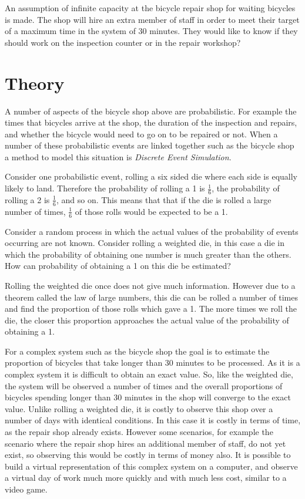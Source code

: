 An assumption of infinite capacity at the bicycle repair shop
for waiting bicycles is made.
The shop will hire an extra member of staff in order to meet their target of a
maximum time in the system of 30 minutes. They would like to know if they
should work on the inspection counter or in the repair workshop?

\section{Theory}\label{sec:theory}

A number of aspects of the bicycle shop above are
probabilistic. For example the
times that bicycles arrive at the shop, the duration of the inspection and
repairs, and whether the bicycle would need to go on to be repaired or not.
When a number of these probabilistic events are linked together
such as the bicycle shop a method to model this situation is
\textit{Discrete Event Simulation}.

Consider one probabilistic event, rolling a six sided die where each side is
equally likely to land.  Therefore the probability of rolling a 1 is
\(\frac{1}{6}\), the probability of rolling a 2 is \(\frac{1}{6}\), and so on.
This means that that if the die is rolled a large number of times,
\(\frac{1}{6}\) of those rolls would be expected to be a 1.

Consider a random process in which the actual values of the probability
of events occurring are not known. Consider rolling a weighted die, in this case a
die in which the probability of obtaining one number is much greater than the
others. How can probability of obtaining a 1 on this die be estimated?

Rolling the weighted die once does not give much information.
However due to a theorem called the law of large numbers,
this die can be rolled a number of times
and find the proportion of those rolls which gave a 1. The more times we roll
the die, the closer this proportion approaches the actual value of the
probability of obtaining a 1.

For a complex system such as the bicycle shop the goal is to estimate the
proportion of bicycles that take longer than 30 minutes to be processed. As it
is a complex system it is difficult to obtain an exact value. So,
like the weighted die, the system will be observed a number of times and
the overall proportions
of bicycles spending longer than 30 minutes in the shop will converge to
the exact value.
Unlike rolling a weighted die, it is costly to observe this shop over a
number of days with identical conditions. In this case it is costly in terms of
time, as the repair shop already exists. However some scenarios, for example the
scenario where the repair shop hires an additional member of staff, do not yet
exist, so observing this would be costly in terms of money also.
It is possible to build a virtual representation of this complex system on a
computer, and observe a virtual day of work much more quickly and with much less
cost, similar to a video game.

